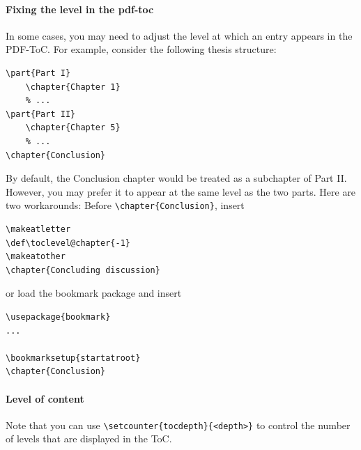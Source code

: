 \paragraph{Fixing the level in the pdf-toc}
In some cases, you may need to adjust the level at which an entry appears in the PDF-ToC. For example, consider the following thesis structure:
\begin{lstlisting}
\part{Part I}
	\chapter{Chapter 1}
	% ... 
\part{Part II}
	\chapter{Chapter 5}
	% ...
\chapter{Conclusion}
\end{lstlisting}
By default, the Conclusion chapter would be treated as a subchapter of Part II. However, you may prefer it to appear at the same level as the two parts. Here are two workarounds:
Before \verb|\chapter{Conclusion}|, insert
\begin{lstlisting}
\makeatletter
\def\toclevel@chapter{-1}
\makeatother
\chapter{Concluding discussion}
\end{lstlisting}
or load the bookmark package and insert
\begin{lstlisting}
\usepackage{bookmark}
...

\bookmarksetup{startatroot}
\chapter{Conclusion}
\end{lstlisting}

\paragraph{Level of content}
Note that you can use \verb|\setcounter{tocdepth}{<depth>}| to control the number of levels that are displayed in the ToC.


